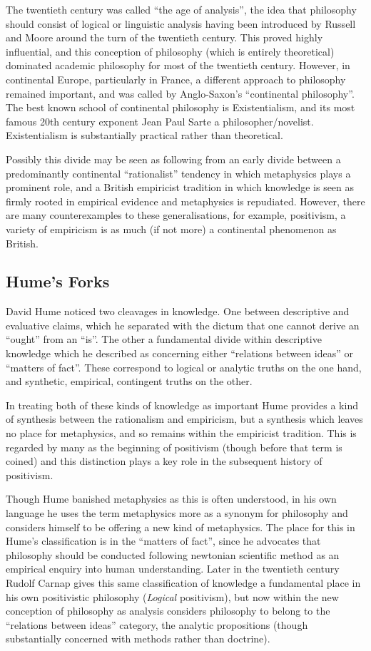 \documentclass[10pt,titlepage]{article}
\begin{document}
The twentieth century was called ``the age of analysis'', the idea that philosophy should consist of logical or linguistic analysis having been introduced by Russell and Moore around the turn of the twentieth century.
This proved highly influential, and this conception of philosophy (which is entirely theoretical) dominated academic philosophy for most of the twentieth century.
However, in continental Europe, particularly in France, a different approach to philosophy remained important, and was called by Anglo-Saxon's ``continental philosophy''.
The best known school of continental philosophy is Existentialism, and its most famous 20th century exponent Jean Paul Sarte a philosopher/novelist.
Existentialism is substantially practical rather than theoretical.

Possibly this divide may be seen as following from an early divide between a predominantly continental ``rationalist'' tendency in which metaphysics plays a prominent role, and a British empiricist tradition in which knowledge is seen as firmly rooted in empirical evidence and metaphysics is repudiated.
However, there are many counterexamples to these generalisations, for example, positivism, a variety of empiricism is as much (if not more) a continental phenomenon as British.

\subsection{Hume's Forks}

David Hume noticed two cleavages in knowledge.
One between descriptive and evaluative claims, which he separated with the dictum that one cannot derive an ``ought'' from an ``is''.
The other a fundamental divide within descriptive knowledge which he described as concerning either ``relations between ideas'' or ``matters of fact''.
These correspond to logical or analytic truths on the one hand, and synthetic, empirical, contingent truths on the other.

In treating both of these kinds of knowledge as important Hume provides a kind of synthesis between the rationalism and empiricism, but a synthesis which leaves no place for metaphysics, and so remains within the empiricist tradition.
This is regarded by many as the beginning of positivism (though before that term is coined) and this distinction plays a key role in the subsequent history of positivism.

Though Hume banished metaphysics as this is often understood, in his own language he uses the term metaphysics more as a synonym for philosophy and considers himself to be offering a new kind of metaphysics.
The place for this in Hume's classification is in the ``matters of fact'', since he advocates that philosophy should be conducted following newtonian scientific method as an empirical enquiry into human understanding.
Later in the twentieth century Rudolf Carnap gives this same classification of knowledge a fundamental place in his own positivistic philosophy (\emph{Logical} positivism), but now within the new conception of philosophy as analysis considers philosophy to belong to the ``relations between ideas'' category, the analytic propositions (though substantially concerned with methods rather than doctrine).
\end{document}
